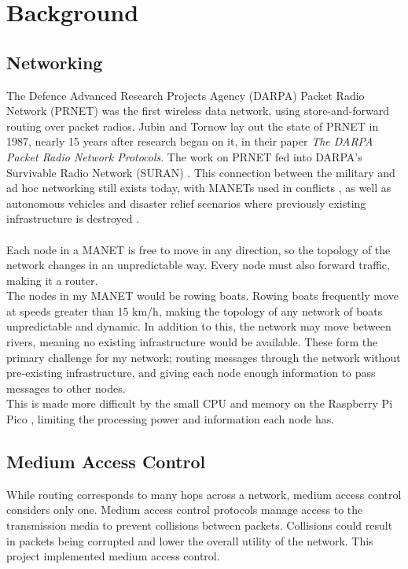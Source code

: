 \documentclass[12pt,a4paper]{report}
\begin{document}
\section{Background}
\subsection{Networking}
The Defence Advanced Research Projects Agency (DARPA) Packet Radio Network (PRNET) \cite{prnet} was the first wireless data network, using store-and-forward routing over packet radios. Jubin and Tornow lay out the state of PRNET in 1987, nearly 15 years after research began on it, in their paper \emph{The DARPA Packet Radio Network Protocols}. The work on PRNET fed into DARPA's Survivable Radio Network (SURAN) \cite{suran}. This connection between the military and ad hoc networking still exists today, with MANETs used in conflicts \cite{military}, as well as autonomous vehicles \cite{vehicle} and disaster relief scenarios where previously existing infrastructure is destroyed \cite{disaster}. \\ \\
Each node in a MANET is free to move  in any direction, so the topology of the network changes in an unpredictable way. Every node must also forward traffic, making it a router. \\
The nodes in my MANET would be rowing boats. Rowing boats frequently move at speeds greater than 15 km/h, making the topology of any network of boats unpredictable and dynamic. In addition to this, the network may move between rivers, meaning no existing infrastructure would be available. These form the primary challenge for my network; routing messages through the network without pre-existing infrastructure, and giving each node enough information to pass messages to other nodes. \\
This is made more difficult by the small CPU and memory on the Raspberry Pi Pico \cite{rp2040}, limiting the processing power and information each node has.  \\
\subsection{Medium Access Control}
While routing corresponds to many hops across a network, medium access control considers only one. Medium access control protocols manage access to the transmission media to prevent collisions between packets. Collisions could result in packets being corrupted and lower the overall utility of the network. This project implemented medium access control. \\
\end{document}
